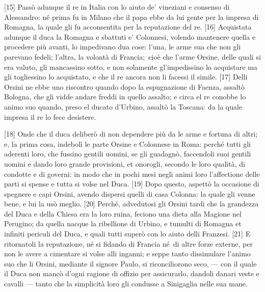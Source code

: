 {[}15{]} Passò adunque il re in Italia con lo aiuto de' vineziani e
consenso di Alessandro: né prima fu in Milano che il papa ebbe da lui
gente per la impresa di Romagna, la quale gli fu acconsentita per la
reputazione del re. {[}16{]} Acquistata adunque il duca la Romagna e
sbattuti e' Colonnesi, volendo mantenere quella e procedere più avanti,
lo impedivano dua cose: l'una, le arme sua che non gli parevano fedeli;
l'altra, la volontà di Francia;\est\ cioè che l'arme Orsine, delle quali si
era valuto, gli mancassino sotto, e non solamente gl'impedissino lo
acquistare ma gli togliessino lo acquistato, e che il re ancora non li
facessi il simile. {[}17{]} Delli Orsini ne ebbe uno riscontro quando
dopo la espugnazione di Faenza, assaltò Bologna, che gli vidde andare
freddi in quello assalto; e circa el re conobbe lo animo suo quando,
preso el ducato d'Urbino, assaltò la Toscana: da la quale impresa il re
lo fece desistere.

{[}18{]} Onde che il duca deliberò di non dependere più da le arme e
fortuna di altri; e, la prima cosa, indebolì le parte Orsine e Colonnese
in Roma: perché tutti gli aderenti loro, che fussino gentili uomini, se
gli guadagnò, faccendoli suoi gentili uomini e dando loro grande
provisioni, et onorogli, secondo le loro qualità, di condotte e di
governi: in modo che in pochi mesi negli animi loro l'affectione delle
parti si spense e tutta si volse nel Duca. {[}19{]} Dopo questo, aspettò
la occasione di spegnere e capi Orsini, avendo dispersi quelli di casa
Colonna: la quale gli venne bene, e lui la usò meglio. {[}20{]} Perché,
advedutosi gli Orsini tardi che la grandezza del Duca e della Chiesa era
la loro ruina, feciono una dieta alla Magione nel Perugino; da quella
nacque la ribellione di Urbino, e tumulti di Romagna et infiniti
periculi del Duca, e quali tutti superò con lo aiuto delli Franzesi.
{[}21{]} E ritornatoli la reputazione, né si fidando di Francia né\est\ di
altre forze externe, per non le avere a cimentare si volse alli inganni;
e seppe tanto dissimulare l'animo suo che li Orsini, mediante il signore
Paulo, si riconciliorono seco, --- con il quale il Duca non mancò d'ogni
ragione di offizio per assicurarlo, dandoli danari veste e cavalli ---
tanto che la simplicità loro gli condusse a Sinigaglia nelle sua mane.

